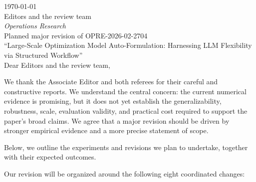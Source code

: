 \documentclass[11pt]{article}
\begin{document}
\onehalfspacing

\begin{flushleft}
    \today \\
    Editors and the review team\\
    {\it Operations Research}\\
    \vspace{.6cm}
    Planned major revision of OPRE-2026-02-2704\\
    ``Large-Scale Optimization Model Auto-Formulation: Harnessing LLM Flexibility via Structured Workflow''\\
    \vspace{.6cm}
    Dear Editors and the review team,
\end{flushleft}

We thank the Associate Editor and both referees for their careful and constructive reports. We understand the central concern: the current numerical evidence is promising, but it does not yet establish the generalizability, robustness, scale, evaluation validity, and practical cost required to support the paper's broad claims. We agree that a major revision should be driven by stronger empirical evidence and a more precise statement of scope.

Below, we outline the experiments and revisions we plan to undertake, together with their expected outcomes.

Our revision will be organized around the following eight coordinated
changes:
\end{document}
